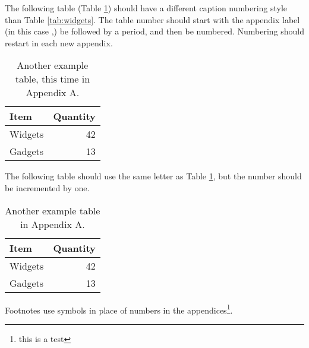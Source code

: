 The following table (Table \ref{tab:AppAWidgets}) should have a different caption numbering style than Table \ref{tab:widgets}. The table number should start with the appendix label (in this case \thesection,) be followed by a period, and then be numbered. Numbering should restart in each new appendix.

\begin{table}[!ht]
\centering
\caption[The first table in Appendix A]{Another example table, this time in Appendix A.}\label{tab:AppAWidgets}
\begin{tabular}{lr}
Item & Quantity \\
\hline
Widgets & 42 \\
Gadgets & 13
\end{tabular}
\end{table}

The following table should use the same letter as Table \ref{tab:AppAWidgets}, but the number should be incremented by one.

\begin{table}[!ht]
\centering
\caption[A second table in Appendix A]{Another example table in Appendix A.}\label{tab:AppAWidgetsTwo}
\begin{tabular}{lr}
Item & Quantity \\
\hline
Widgets & 42 \\
Gadgets & 13
\end{tabular}
\end{table}

Footnotes use symbols in place of numbers in the appendices\footnote{this is a test}.